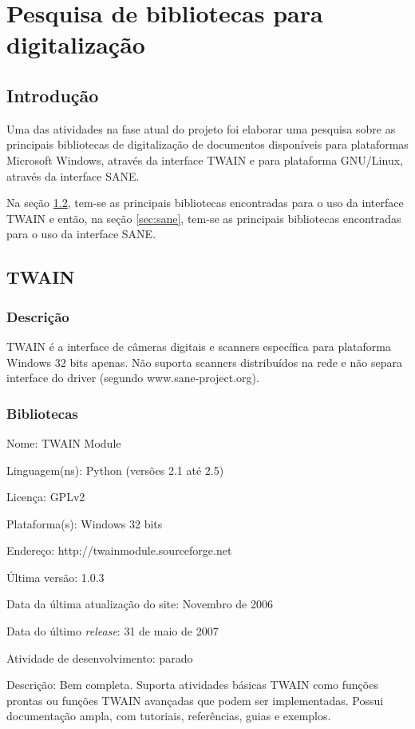 \section{Pesquisa de bibliotecas para digitalização}
\label{sec:pesquisa_libs}

\subsection{Introdução}
Uma das atividades na fase atual do projeto foi elaborar uma pesquisa sobre as principais bibliotecas de digitalização de documentos disponíveis para plataformas Microsoft Windows, através da interface TWAIN e para plataforma GNU/Linux, através da interface SANE. 

Na seção \ref{sec:twain}, tem-se as principais bibliotecas encontradas para o uso da interface TWAIN e então, na seção \ref{sec:sane}, tem-se as principais bibliotecas encontradas para o uso da interface SANE.

\subsection{TWAIN}
\label{sec:twain}

\subsubsection{Descrição}
TWAIN é a interface de câmeras digitais e scanners específica para plataforma Windows 32 bits apenas. Não suporta scanners distribuídos na rede e não separa interface do driver (segundo www.sane-project.org).

\subsubsection{Bibliotecas}
\begin{description*}
	\item[Nome:] TWAIN Module
	\item[Linguagem(ns):] Python (versões 2.1 até 2.5)
	\item[Licença:] GPLv2
	\item[Plataforma(s):] Windows 32 bits
	\item[Endereço:] http://twainmodule.sourceforge.net
	\item[Última versão:] 1.0.3
	\item[Data da última atualização do site:] Novembro de 2006
	\item[Data do último {\it release}:] 31 de maio de 2007
	\item[Atividade de desenvolvimento:] parado
	\item[Descrição:] 
	Bem completa. Suporta atividades básicas TWAIN como funções prontas ou funções TWAIN avançadas que podem ser implementadas. Possui documentação ampla, com tutoriais, referências, guias e exemplos.
\end{description*}

